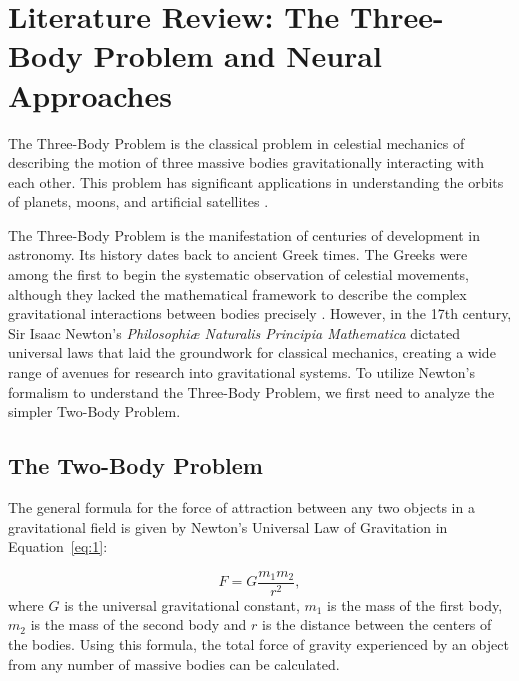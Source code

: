 \documentclass[12pt,a4paper]{article}
\begin{document}
\section{Literature Review: The Three-Body Problem and Neural Approaches}
\label{sec:litreview}

The Three-Body Problem is the classical problem in celestial mechanics of describing the motion of three massive bodies gravitationally interacting with each other. This problem has significant applications in understanding the orbits of planets, moons, and artificial satellites \citep{gardner2006james}.

The Three-Body Problem is the manifestation of centuries of development in astronomy. Its history dates back to ancient Greek times. The Greeks were among the first to begin the systematic observation of celestial movements, although they lacked the mathematical framework to describe the complex gravitational interactions between bodies precisely \citep{anjum2020timelinegravity}. However, in the 17th century, Sir Isaac Newton's \textit{Philosophiæ Naturalis Principia Mathematica} \citep{newton1687principia, cohen1999principia} dictated universal laws that laid the groundwork for classical mechanics, creating a wide range of avenues for research into gravitational systems. To utilize Newton's formalism to understand the Three-Body Problem, we first need to analyze the simpler Two-Body Problem.

\subsection{The Two-Body Problem}
\label{subsec:2bp}
The general formula for the force of attraction between any two objects in a gravitational field is given by Newton's Universal Law of Gravitation in Equation~\ref{eq:1}:

\begin{equation}
    F=G\frac{m_1m_2}{r^2},
    \label{eq:1}
\end{equation}
where $G$ is the universal gravitational constant, $m_1$ is the mass of the first body, $m_2$ is the mass of the second body and $r$ is the distance between the centers of the bodies. Using this formula, the total force of gravity experienced by an object from any number of massive bodies can be calculated.
\end{document}
